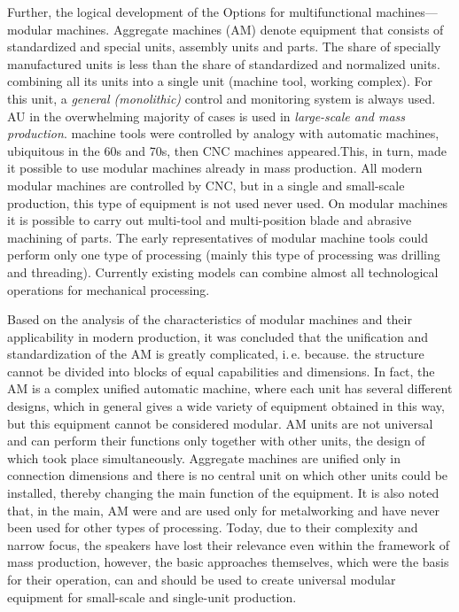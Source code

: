 Further, the logical development of the Options for multifunctional machines---modular machines. Aggregate machines (AM) denote equipment that consists of standardized and special units, assembly units and parts. The share of specially manufactured units is less than the share of standardized and normalized units. combining all its units into a single unit (machine tool, working complex). For this unit, a \textit{general (monolithic)} control and monitoring system is always used. AU in the overwhelming majority of cases is used in \textit{large-scale and mass production}. machine tools were controlled by analogy with automatic machines, ubiquitous in the 60s and 70s, then CNC machines appeared.This, in turn, made it possible to use modular machines already in mass production. All modern modular machines are controlled by CNC, but in a single and small-scale production, this type of equipment is not used never used. On modular machines it is possible to carry out multi-tool and multi-position blade and abrasive machining of parts. The early representatives of modular machine tools could perform only one type of processing (mainly this type of processing was drilling and threading). Currently existing models can combine almost all technological operations for mechanical processing.

Based on the analysis of the characteristics of modular machines and their applicability in modern production, it was concluded that the unification and standardization of the AM is greatly complicated, i.\,e. because. the structure cannot be divided into blocks of equal capabilities and dimensions. In fact, the AM is a complex unified automatic machine, where each unit has several different designs, which in general gives a wide variety of equipment obtained in this way, but this equipment cannot be considered modular. AM units are not universal and can perform their functions only together with other units, the design of which took place simultaneously. Aggregate machines are unified only in connection dimensions and there is no central unit on which other units could be installed, thereby changing the main function of the equipment. It is also noted that, in the main, AM were and are used only for metalworking and have never been used for other types of processing. Today, due to their complexity and narrow focus, the speakers have lost their relevance even within the framework of mass production, however, the basic approaches themselves, which were the basis for their operation, can and should be used to create universal modular equipment for small-scale and single-unit production.

